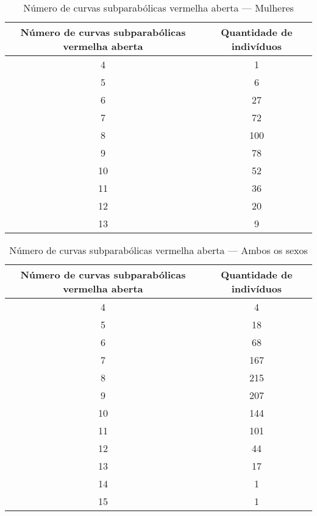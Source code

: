\documentclass[a4paper,12pt]{article}
\begin{document}
\begin{table}[h!]
\centering
\caption{Número de curvas subparabólicas vermelha aberta — Mulheres}
\begin{tabular}{c c}
\hline
\textbf{Número de curvas subparabólicas vermelha aberta} & \textbf{Quantidade de indivíduos} \\ 
\hline
4  & 1  \\
5  & 6  \\
6  & 27 \\
7  & 72 \\
8  & 100\\
9  & 78 \\
10 & 52 \\
11 & 36 \\
12 & 20 \\
13 & 9  \\
\hline
\end{tabular}
\end{table}


\begin{table}[h!]
\centering
\caption{Número de curvas subparabólicas vermelha aberta — Ambos os sexos}
\begin{tabular}{c c}
\hline
\textbf{Número de curvas subparabólicas vermelha aberta} & \textbf{Quantidade de indivíduos} \\ 
\hline
4  & 4   \\
5  & 18  \\
6  & 68  \\
7  & 167 \\
8  & 215 \\
9  & 207 \\
10 & 144 \\
11 & 101 \\
12 & 44  \\
13 & 17  \\
14 & 1   \\
15 & 1   \\
\hline
\end{tabular}
\end{table}
\end{document}
